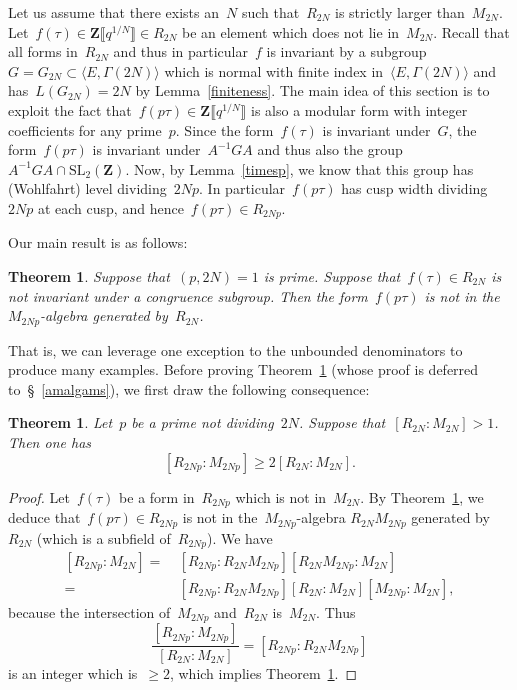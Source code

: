 \documentclass[10pt]{amsart}
\def\SSSS{\S}
\def\Z{\mathbf{Z}}
\newtheorem{theorem}[subsubsection]{Theorem}
\theoremstyle{remark}
\numberwithin{equation}{subsection}
\def\SL{\mathrm{SL}}
\begin{document}
Let us assume that there exists an~$N$ such that~$R_{2N}$ is strictly larger than~$M_{2N}$.
Let~$f(\tau)  \in \Z  \llbracket q^{1/N} \rrbracket \in R_{2N}$ be an element which does not lie in~$M_{2N}$.
Recall that all  forms in~$R_{2N}$ and thus in particular~$f$ is invariant by a subgroup~$G=G_{2N} \subset \langle E, \Gamma(2N) \rangle$
which is normal with finite index in~$\langle E,\Gamma(2N)\rangle$ and has~$L(G_{2N}) = 2N$ by Lemma~\ref{finiteness}.
The main idea of this section is to exploit the fact that~$f(p \tau) \in \Z \llbracket q^{1/N} \rrbracket$ is also a modular form with integer coefficients for any prime~$p$.
Since the form~$f(\tau)$ is invariant under~$G$, the form~$f(p \tau)$
is invariant under~$A^{-1}GA$  and thus also the group~$A^{-1}GA \cap \SL_2(\Z)$.
Now, by Lemma~\ref{timesp}, we know that this group has 
(Wohlfahrt)
level dividing~$2Np$. In particular~$f(p \tau)$ has cusp width dividing~$2Np$ at each cusp,
and hence~$f(p \tau) \in R_{2Np}$.

Our main result is as follows:
\begin{theorem} \label{fix}
Suppose that~$(p,2N)=1$ is  prime.
Suppose that~$f(\tau) \in R_{2N}$ is \emph{not} invariant under a congruence subgroup.
Then the form~$f(p \tau)$ is not in the~$M_{2Np}$-algebra generated by~$R_{2N}$.
\end{theorem}

That is, we can leverage one exception to the unbounded denominators
to produce many examples. 
Before proving Theorem~\ref{fix} (whose proof is deferred to~\SSSS~\ref{amalgams}), we first draw the following consequence:

\begin{theorem} \label{theoremgoal}
Let~$p$ be a prime not dividing~$2N$.
Suppose %
that~$[R_{2N}:M_{2N}] > 1$.
Then one has
$$[R_{2Np}:M_{2Np}] \ge 2 [R_{2N}:M_{2N}].$$
\end{theorem}

\begin{proof}
Let~$f(\tau)$ be a form in~$R_{2Np}$ which is not in~$M_{2N}$.
By Theorem~\ref{fix},
we deduce
that~$f(p \tau) \in R_{2Np}$ is not in the~$M_{2Np}$-algebra
$R_{2N} M_{2Np}$ 
generated by~$R_{2N}$ (which is a subfield of~$R_{2Np}$). We have
\begin{equation*}
\begin{aligned}
[R_{2Np}:M_{2N}] = & \  [R_{2Np}:R_{2N} M_{2Np}] [R_{2N} M_{2Np}:M_{2N}] \\
= & \ [R_{2Np}:R_{2N} M_{2Np}]  [R_{2N}:M_{2N}] [M_{2Np}:M_{2N}], \end{aligned}
\end{equation*}
because the intersection of~$M_{2Np}$ and~$R_{2N}$ is~$M_{2N}$. Thus
$$\frac{[R_{2Np}:M_{2Np}] }{[R_{2N}:M_{2N}]} =   [R_{2Np}:R_{2N} M_{2Np}]$$
is an integer which is~$\ge 2$, 
which implies
 Theorem~\ref{theoremgoal}.
\end{proof}
 
\end{document}
